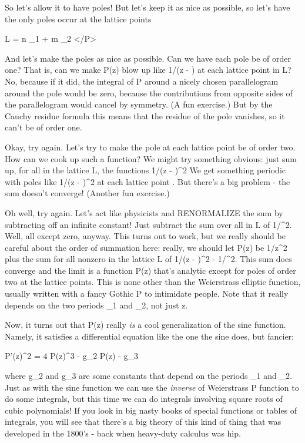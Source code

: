 So let's allow it to have poles!  But let's keep it as nice as possible,
so let's have the only poles occur at the lattice points 

		L = {n \omega _{1} + m \omega _{2}}
</P>

And let's make the poles as nice as possible.  Can we have each pole
be of order one?   That is, can we make P(z) blow up like 1/(z - \omega ) at
each lattice point \omega  in L?  No, because if it did, the integral of 
P around a nicely chosen parallelogram around the pole would be zero, because
the contributions from opposite sides of the parallelogram would cancel
by symmetry.  (A fun exercise.)  But by the Cauchy residue formula this
means that the residue of the pole vanishes, so it can't be of order
one.

Okay, try again.  Let's try to make the pole at each lattice point be of
order two.  How can we cook up such a function?  We might try something
obvious: just sum up, for all \omega  in the lattice L, the functions
1/(z - \omega )^{2}  
We get something periodic with poles like 
1/(z - \omega )^{2} at each lattice point \omega .  But there's a big 
problem - the sum doesn't converge!  (Another fun exercise.)

Oh well, try again.  Let's act like physicists and RENORMALIZE the sum
by subtracting off an infinite constant!  Just subtract the sum over all
\omega  in L of 1/\omega ^{2}.  
Well, all \omega  except zero, anyway.  This
turns out to work, but we really should be careful about the order of
summation here: really, we should let P(z) be 1/z^{2} 
plus the sum for all
nonzero \omega  in the lattice L of 1/(z - \omega )^{2} - 
1/\omega ^{2}.  This sum
does converge and the limit is a function P(z) that's analytic except for
poles of order two at the lattice points.  This is none other than the
Weierstrass elliptic function, usually written with a fancy Gothic P to
intimidate people.   Note that it really depends on the two periods
\omega _{1} and \omega _{2}, not just z.

Now, it turns out that P(z) really \emph{is} a cool generalization of the
sine function.  Namely, it satisfies a differential equation like the
one the sine does, but fancier:

                    P'(z)^{2} = 4 P(z)^{3} - 
g_{2} P(z) - g_{3}

where g_{2} and g_{3} are some constants 
that depend on the periods \omega _{1}
and \omega _{2}.  
Just as with the sine function we can use the \emph{inverse} of
Weierstrass P function to do some integrals, but this time we can do
integrals involving square roots of cubic polynomials!  If you look in
big nasty books of special functions or tables of integrals, you will
see that there's a big theory of this kind of thing that was developed
in the 1800's - back when heavy-duty calculus was hip.

